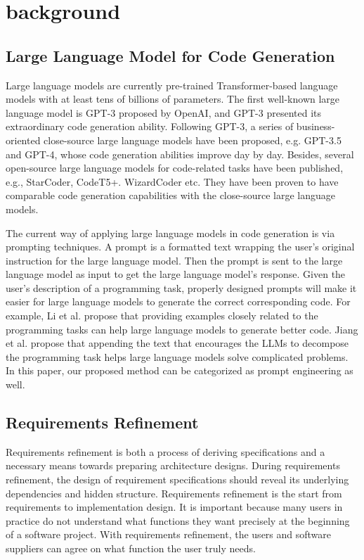 \documentclass[sigconf]{acmart}
\begin{document}
\section{background}
\subsection{Large Language Model for Code Generation}
Large language models are currently pre-trained Transformer-based language models with at least tens of billions of parameters. The first well-known large language model is GPT-3 \cite{gpt-3} proposed by OpenAI, and GPT-3 presented its extraordinary code generation ability. Following GPT-3, a series of business-oriented close-source large language models have been proposed, e.g. GPT-3.5 and GPT-4, whose code generation abilities improve day by day. Besides, several open-source large language models for code-related tasks have been published, e.g., StarCoder\cite{star_coder}, CodeT5+\cite{codet5+}. WizardCoder\cite{wizard_coder} etc. They have been proven to have comparable code generation capabilities with the close-source large language models.

The current way of applying large language models in code generation is via prompting techniques. A prompt is a formatted text wrapping the user's original instruction for the large language model. Then the prompt is sent to the large language model as input to get the large language model's response. Given the user's description of a programming task, properly designed prompts will make it easier for large language models to generate the correct corresponding code. For example, Li et al. \cite{li}propose that providing examples closely related to the programming tasks can help large language models to generate better code. Jiang et al. \cite{jiang}propose that appending the text that encourages the LLMs to decompose the programming task helps large language models solve complicated problems. In this paper, our proposed method can be categorized as prompt engineering as well.

\subsection{Requirements Refinement}
Requirements refinement is both a process of deriving specifications and a necessary means towards preparing architecture designs. During requirements refinement, the design of requirement specifications should reveal its underlying dependencies and hidden structure. Requirements refinement is the start from requirements to implementation design. It is important because many users in practice do not understand what functions they want precisely at the beginning of a software project\cite{sofl_analyse}. With requirements refinement, the users and software suppliers can agree on what function the user truly needs.
\end{document}

